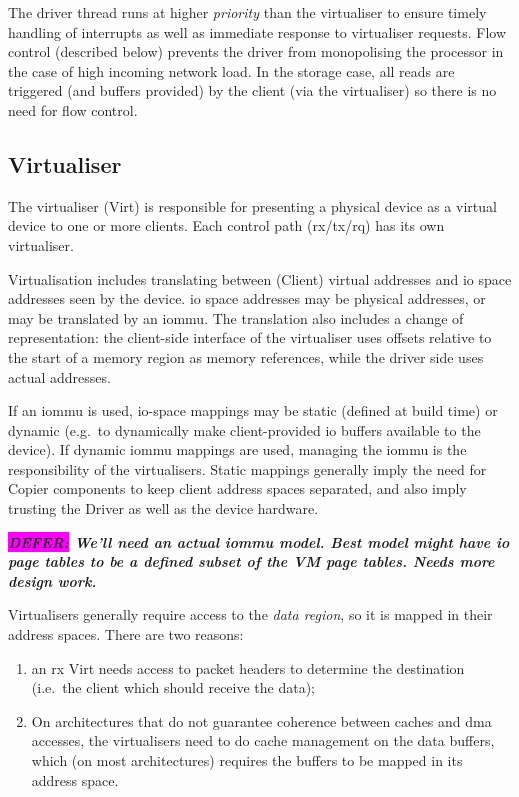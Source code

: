 \documentclass[a4paper,12pt]{report}
\newcommand{\DEFER}[1]{\textbf{\textsl{\colorbox{magenta}{DEFER:} #1}}}
\newcommand{\DEFER}[1]{\relax}
\begin{document}
The driver thread runs at higher \emph{priority} than the
virtualiser to ensure timely handling of interrupts as well as immediate
response to virtualiser requests. Flow control (described below) prevents the driver from
monopolising the processor in the case of high incoming network load.
In the storage case, all reads are triggered (and buffers
provided) by the client (via the virtualiser) so there is no need for flow control.

\subsection{Virtualiser}\label{s:model_virt}

The virtualiser (Virt) is responsible for presenting a physical device as a
virtual device to one or more clients. Each control path (\gls{rx}/\gls{tx}/\gls{rq})
has its own virtualiser.

Virtualisation includes translating between (Client) virtual
addresses and \gls{io} space addresses seen by the device. \gls{io} space
addresses may be physical addresses, or may be translated by an
\gls{iommu}. The translation also includes a change of representation: the
client-side interface of the virtualiser uses offsets relative to the
start of a memory region as memory references, while the driver side
uses actual addresses.

If an \gls{iommu} is used, \gls{io}-space mappings may be static (defined at
build time) or dynamic (e.g.\ to dynamically make client-provided \gls{io}
buffers available to the device). If dynamic \gls{iommu} mappings are used,
managing the \gls{iommu} is the responsibility of the virtualisers. Static
mappings generally imply the need for Copier components to keep client
address spaces separated, and also imply trusting the Driver as well
as the device hardware.

\DEFER{We'll need an actual \gls{iommu} model. Best model might have \gls{io} page
  tables to be a defined subset of the VM page tables. Needs more
  design work.}


Virtualisers generally require access to the \emph{data region},
so it is mapped in their address spaces. There are two reasons:
\begin{enumerate}
\item an \gls{rx} Virt needs access to packet headers to determine
  the destination (i.e.\ the client which should receive the data);
\item On architectures that do not guarantee coherence between caches and
  \gls{dma} accesses, the virtualisers need to do cache management on the data buffers, which (on
  most architectures) requires the buffers to be mapped in its address
  space.
\end{enumerate}
\end{document}
